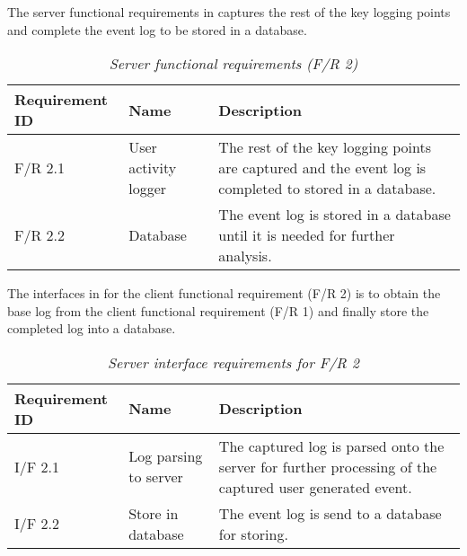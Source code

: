 The server functional requirements in  captures the rest of the key logging points and complete the event log to be stored in a database. 

\begin{table}[!htb]
	\centering
	\small
	\caption[Server functional requirements]
	{\textit{Server functional requirements (F/R 2)}}
	\label{tbl:Ch2_Server_Functional_Requirements}
	\begin{tabularx}{\textwidth}{|l|l|X|}
		\hline \textbf{Requirement ID} & \textbf{Name} & \textbf{Description} \\
		\hline F/R 2.1 & User activity logger & The rest of the key logging points are captured and the event log is completed to stored in a database.\\
		\hline F/R 2.2 & Database & The event log is stored in a database until it is needed for further analysis.\\
		\hline
	\end{tabularx}
\end{table}

The interfaces in  for the client functional requirement (F/R 2) is to obtain the base log from the client functional requirement (F/R 1) and finally store the completed log into a database.

\begin{table}[!htb]
	\centering
	\small
	\caption[Server interface requirements]
	{\textit{Server interface requirements for F/R 2}}
	\label{tbl:Ch2_Server_Interface_Requirements}
	\begin{tabularx}{\textwidth}{|l|l|X|}
		\hline \textbf{Requirement ID} & \textbf{Name} & \textbf{Description} \\
		\hline I/F 2.1 & Log parsing to server & The captured log is parsed onto the server for further processing of the captured user generated event.\\
		\hline I/F 2.2 & Store in database & The event log is send to a database for storing.\\
		\hline
	\end{tabularx}
\end{table}

\clearpage

